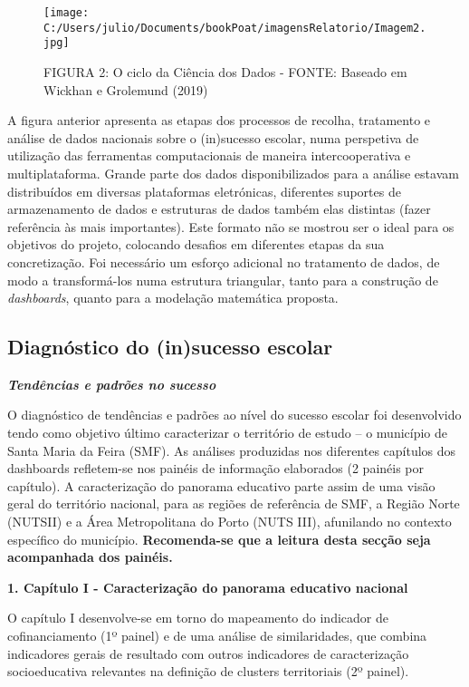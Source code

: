 \documentclass[
]{book}
\begin{document}
\begin{figure}
\centering
\texttt{[image: C:/Users/julio/Documents/bookPoat/imagensRelatorio/Imagem2.jpg]}
\caption{FIGURA 2: O ciclo da Ciência dos Dados - FONTE: Baseado em Wickhan e Grolemund (2019)}
\end{figure}

A figura anterior apresenta as etapas dos processos de recolha, tratamento e análise de dados nacionais sobre o (in)sucesso escolar, numa perspetiva de utilização das ferramentas computacionais de maneira intercooperativa e multiplataforma. Grande parte dos dados disponibilizados para a análise estavam distribuídos em diversas plataformas eletrónicas, diferentes suportes de armazenamento de dados e estruturas de dados também elas distintas (fazer referência às mais importantes). Este formato não se mostrou ser o ideal para os objetivos do projeto, colocando desafios em diferentes etapas da sua concretização. Foi necessário um esforço adicional no tratamento de dados, de modo a transformá-los numa estrutura triangular, tanto para a construção de \emph{dashboards}, quanto para a modelação matemática proposta.

\hypertarget{diagnuxf3stico-do-insucesso-escolar}{%
\subsection{\texorpdfstring{\textbf{Diagnóstico do (in)sucesso escolar}}{Diagnóstico do (in)sucesso escolar}}\label{diagnuxf3stico-do-insucesso-escolar}}

\textbf{\emph{Tendências e padrões no sucesso}}

O diagnóstico de tendências e padrões ao nível do sucesso escolar foi desenvolvido tendo como objetivo último caracterizar o território de estudo -- o município de Santa Maria da Feira (SMF). As análises produzidas nos diferentes capítulos dos dashboards refletem-se nos painéis de informação elaborados (2 painéis por capítulo). A caracterização do panorama educativo parte assim de uma visão geral do território nacional, para as regiões de referência de SMF, a Região Norte (NUTSII) e a Área Metropolitana do Porto (NUTS III), afunilando no contexto específico do município. \textbf{Recomenda-se que a leitura desta secção seja acompanhada dos painéis.}

\textbf{1. Capítulo I - Caracterização do panorama educativo nacional}

O capítulo I desenvolve-se em torno do mapeamento do indicador de cofinanciamento (1º painel) e de uma análise de similaridades, que combina indicadores gerais de resultado com outros indicadores de caracterização socioeducativa relevantes na definição de clusters territoriais (2º painel).
\end{document}
